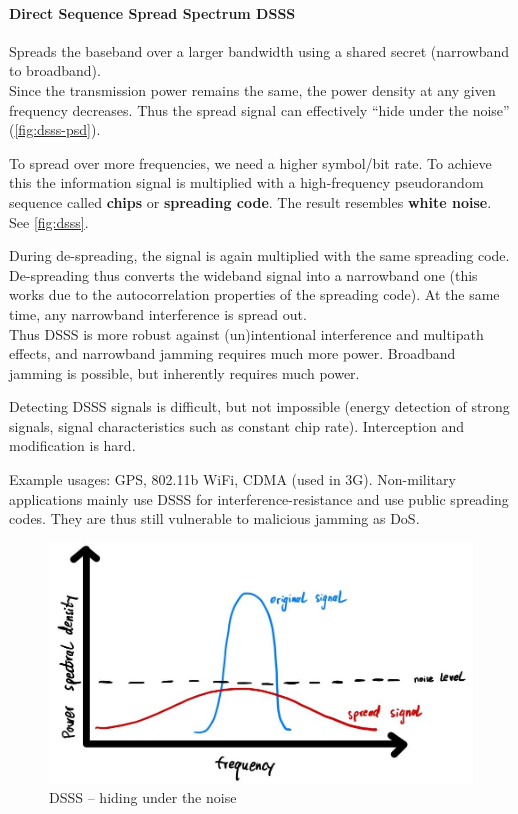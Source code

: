 \paragraph{Direct Sequence Spread Spectrum DSSS}
Spreads the baseband over a larger bandwidth using a shared secret (narrowband to broadband). \\
Since the transmission power remains the same, the power density at any given frequency decreases.
Thus the spread signal can effectively ``hide under the noise'' (\autoref{fig:dsss-psd}).

To spread over more frequencies, we need a higher symbol/bit rate.
To achieve this the information signal is multiplied with a high-frequency pseudorandom sequence called \textbf{chips} or \textbf{spreading code}.
The result resembles \textbf{white noise}.
See \autoref{fig:dsss}.

During de-spreading, the signal is again multiplied with the same spreading code.
De-spreading thus converts the wideband signal into a narrowband one (this works due to the autocorrelation properties of the spreading code).
At the same time, any narrowband interference is spread out.
\\
Thus DSSS is more robust against (un)intentional interference and multipath effects, and narrowband jamming requires much more power.
Broadband jamming is possible, but inherently requires much power.

Detecting DSSS signals is difficult, but not impossible (energy detection of strong signals, signal characteristics such as constant chip rate).
Interception and modification is hard.

Example usages: GPS, 802.11b WiFi, CDMA (used in 3G).
Non-military applications mainly use DSSS for interference-resistance and use public spreading codes.
They are thus still vulnerable to malicious jamming as DoS.

\begin{figure}
	\centering
	\includegraphics[scale=0.4]{images/2-dsss-psd.jpg}
	\caption{DSSS -- hiding under the noise}
	\label{fig:dsss-psd}
\end{figure}


